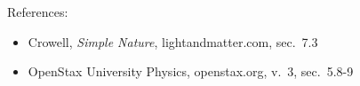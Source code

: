 References:
\begin{itemize}
\item Crowell, \emph{Simple Nature}, lightandmatter.com, sec.~7.3
\item OpenStax University Physics, openstax.org, v.~3, sec.~5.8-9
\end{itemize}
